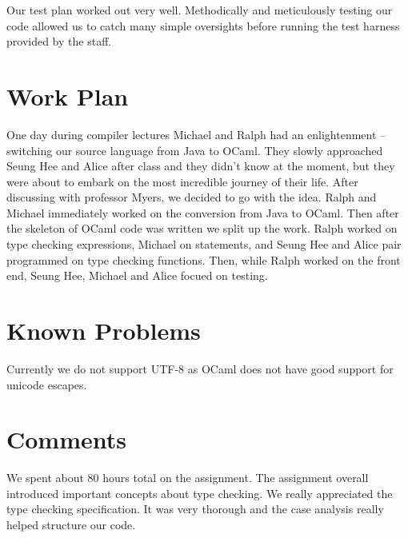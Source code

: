 \documentclass{hw}
\begin{document}
Our test plan worked out very well. Methodically and meticulously testing our code allowed us to catch many simple oversights before running the test harness provided by the staff.

\section{Work Plan}\label{sec:workplan}
One day during compiler lectures Michael and Ralph had an enlightenment -- switching our
source language from Java to OCaml.
They slowly approached Seung Hee and Alice after class and they didn't know at the moment, 
but they were about to embark on the most incredible journey of their life. After discussing
with professor Myers, we decided to go with the idea. Ralph and Michael immediately 
worked on the conversion from Java to OCaml. Then after the skeleton of OCaml code was written
we split up the work. Ralph worked on type checking expressions, Michael on statements,
and Seung Hee and Alice pair programmed on type checking functions. Then, while 
Ralph worked on the front end, Seung Hee, Michael and Alice focued on testing.

\section{Known Problems}\label{sec:problems}
Currently we do not support UTF-8 as OCaml does not have good support for unicode 
escapes. 

\section{Comments}\label{sec:comments}
We spent about 80 hours total on the assignment. The assignment overall
introduced important concepts about type checking. We really appreciated 
the type checking specification. It was very thorough and the case analysis
really helped structure our code.
\end{document}
